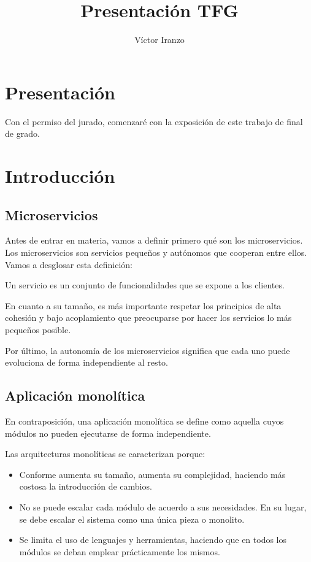 \documentclass[11pt,a4paper]{article}
\author{Víctor Iranzo}
\title{Presentación TFG}
\begin{document}
\maketitle

\section{Presentación}

Con el permiso del jurado, comenzaré con la exposición de este trabajo de final de grado.

\section{Introducción}

\subsection{Microservicios}

Antes de entrar en materia, vamos a definir primero qué son los microservicios. Los microservicios son servicios pequeños y autónomos que cooperan entre ellos. Vamos a desglosar esta definición:

Un servicio es un conjunto de funcionalidades que se expone a los clientes.

En cuanto a su tamaño, es más importante respetar los principios de alta cohesión y bajo acoplamiento que preocuparse por hacer los servicios lo más pequeños posible.

Por último, la autonomía de los microservicios significa que cada uno puede evoluciona de forma independiente al resto.


\subsection{Aplicación monolítica}

En contraposición, una aplicación monolítica se define como aquella cuyos módulos no pueden ejecutarse de forma independiente.

Las arquitecturas monolíticas se caracterizan porque:
\begin{itemize}

\item Conforme aumenta su tamaño, aumenta su complejidad, haciendo más costosa la introducción de cambios.

\item No se puede escalar cada módulo de acuerdo a sus necesidades. En su lugar, se debe escalar el sistema como una única pieza o monolito.

\item Se limita el uso de lenguajes y herramientas, haciendo que en todos los módulos se deban emplear prácticamente los mismos.

\end{itemize}
\end{document}
